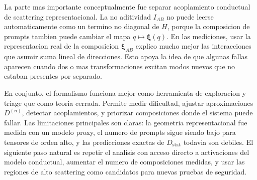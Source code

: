﻿\documentclass[10pt,twocolumn]{article}
\newcommand{\Dstat}{D_{\mathrm{stat}}}
\newcommand{\cond}{C}
\newcommand{\xrep}{\bm{\xi}}
\begin{document}
La parte mas importante conceptualmente fue separar acoplamiento conductual de scattering representacional. La no aditividad \(I_{AB}\) no puede leerse automaticamente como un termino no diagonal de \(H\), porque la composicion de prompts tambien puede cambiar el mapa \(q\mapsto\xrep(q)\). En las mediciones, usar la representacion real de la composicion \(\xrep_{AB}\) explico mucho mejor las interacciones que asumir suma lineal de direcciones. Esto apoya la idea de que algunas fallas aparecen cuando dos o mas transformaciones excitan modos nuevos que no estaban presentes por separado.

En conjunto, el formalismo funciona mejor como herramienta de exploracion y triage que como teoria cerrada. Permite medir dificultad, ajustar aproximaciones \(D^{(n)}\), detectar acoplamientos, y priorizar composiciones donde el sistema puede fallar. Las limitaciones principales son claras: la geometria representacional fue medida con un modelo proxy, el numero de prompts sigue siendo bajo para tensores de orden alto, y las predicciones exactas de \(\Dstat\) todavia son debiles. El siguiente paso natural es repetir el analisis con acceso directo a activaciones del modelo conductual, aumentar el numero de composiciones medidas, y usar las regiones de alto scattering como candidatos para nuevas pruebas de seguridad.




\end{document}
